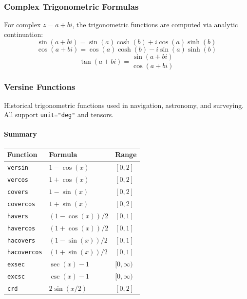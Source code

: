 \subsubsection{Complex Trigonometric Formulas}
For complex $z = a + bi$, the trigonometric functions are computed via analytic continuation:
\[
\sin(a + bi) = \sin(a)\cosh(b) + i\cos(a)\sinh(b)
\]
\[
\cos(a + bi) = \cos(a)\cosh(b) - i\sin(a)\sinh(b)
\]
\[
\tan(a + bi) = \frac{\sin(a + bi)}{\cos(a + bi)}
\]

\subsubsection{Versine Functions}
Historical trigonometric functions used in navigation, astronomy, and surveying. All support \texttt{unit="deg"} and tensors.

\paragraph{Summary}
\begin{center}
\renewcommand{\arraystretch}{1.5}
\begin{tabular}{lll}
\textbf{Function} & \textbf{Formula} & \textbf{Range} \\ \hline
\texttt{versin} & $1 - \cos(x)$ & $[0, 2]$ \\
\texttt{vercos} & $1 + \cos(x)$ & $[0, 2]$ \\
\texttt{covers} & $1 - \sin(x)$ & $[0, 2]$ \\
\texttt{covercos} & $1 + \sin(x)$ & $[0, 2]$ \\
\texttt{havers} & $(1 - \cos(x))/2$ & $[0, 1]$ \\
\texttt{havercos} & $(1 + \cos(x))/2$ & $[0, 1]$ \\
\texttt{hacovers} & $(1 - \sin(x))/2$ & $[0, 1]$ \\
\texttt{hacovercos} & $(1 + \sin(x))/2$ & $[0, 1]$ \\
\texttt{exsec} & $\sec(x) - 1$ & $[0, \infty)$ \\
\texttt{excsc} & $\csc(x) - 1$ & $[0, \infty)$ \\
\texttt{crd} & $2\sin(x/2)$ & $[0, 2]$ \\
\end{tabular}
\end{center}

